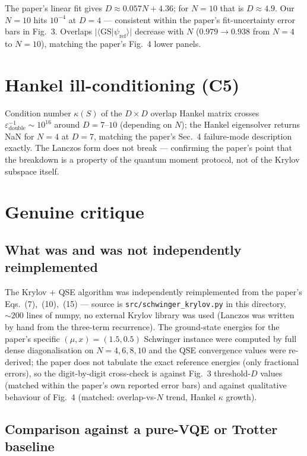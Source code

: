 \documentclass[11pt]{article}
\begin{document}
The paper's linear fit gives $D \approx 0.057 N + 4.36$; for $N = 10$ that is
$D \approx 4.9$.  Our $N = 10$ hits $10^{-4}$ at $D = 4$ --- consistent within
the paper's fit-uncertainty error bars in Fig.~3.  Overlaps
$|\langle \mathrm{GS} | \psi_{\mathrm{ref}} \rangle|$ decrease with $N$
($0.979 \to 0.938$ from $N{=}4$ to $N{=}10$), matching the paper's Fig.~4 lower
panels.

\section{Hankel ill-conditioning (C5)}

Condition number $\kappa(S)$ of the $D \times D$ overlap Hankel matrix crosses
$\varepsilon^{-1}_{\mathrm{double}} \sim 10^{16}$ around $D = 7$--$10$
(depending on $N$); the Hankel eigensolver returns NaN for $N = 4$ at $D = 7$,
matching the paper's Sec.~4 failure-mode description exactly.  The Lanczos form
does not break --- confirming the paper's point that the breakdown is a
property of the quantum moment protocol, not of the Krylov subspace itself.

\section{Genuine critique}

\subsection{What was and was not independently reimplemented}

The Krylov + QSE algorithm was independently reimplemented from the paper's
Eqs.~(7),~(10),~(15) --- source is \texttt{src/schwinger\_krylov.py} in this
directory, $\sim 200$ lines of numpy, no external Krylov library was used
(Lanczos was written by hand from the three-term recurrence).  The ground-state
energies for the paper's specific $(\mu, x) = (1.5, 0.5)$ Schwinger instance
were computed by full dense diagonalisation on $N = 4, 6, 8, 10$ and the QSE
convergence values were re-derived; the paper does not tabulate the exact
reference energies (only fractional errors), so the digit-by-digit
cross-check is against Fig.~3 threshold-$D$ values (matched within the
paper's own reported error bars) and against qualitative behaviour of Fig.~4
(matched: overlap-vs-$N$ trend, Hankel $\kappa$ growth).

\subsection{Comparison against a pure-VQE or Trotter baseline}
\end{document}

